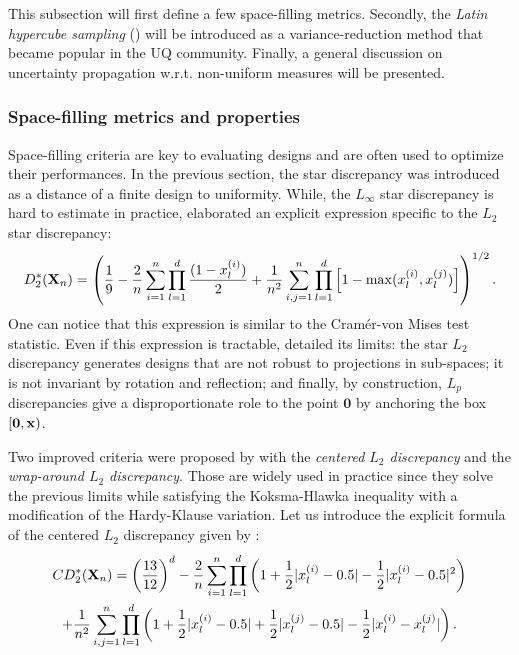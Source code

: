 This subsection will first define a few space-filling metrics. 
Secondly, the \textit{Latin hypercube sampling} () will be introduced as a variance-reduction method that became popular in the UQ community. 
Finally, a general discussion on uncertainty propagation w.r.t. non-uniform measures will be presented.

\subsubsection{Space-filling metrics and properties}
Space-filling criteria are key to evaluating designs and are often used to optimize their performances. 
In the previous section, the star discrepancy was introduced as a distance of a finite design to uniformity. 
While, the $L_\infty$ star discrepancy is hard to estimate in practice, \citet{warnock_1972} elaborated an explicit expression specific to the $L_2$ star discrepancy: 
\begin{equation}
    D^*_2({\bf X}_n) = \left(\frac19 - \frac2n \sum_{i=1}^{n} \prod_{l=1}^{d} \frac{(1-x_l^{(i)})}{2} + \frac{1}{n^2}\sum_{i,j=1}^{n} \prod_{l=1}^{d} \left[1 - \max(x_l^{(i)}, x_l^{(j)})\right]\right)^{1/2}.
\end{equation}
One can notice that this expression is similar to the Cram\'{e}r-von Mises test statistic. 
Even if this expression is tractable, \citet{fang_liu_2018} detailed its limits: 
the star $L_2$ discrepancy generates designs that are not robust to projections in sub-spaces; 
it is not invariant by rotation and reflection; 
and finally, by construction, $L_p$ discrepancies give a disproportionate role to the point $\mathbf{0}$ by anchoring the box $[\mathbf{0}, {\bf x})$.

Two improved criteria were proposed by \citet{hickernell_1998} with the \textit{centered $L_2$ discrepancy} and the \textit{wrap-around $L_2$ discrepancy}. 
Those are widely used in practice since they solve the previous limits while satisfying the Koksma-Hlawka inequality with a modification of the Hardy-Klause variation. 
Let us introduce the explicit formula of the centered $L_2$ discrepancy given by \citet{hickernell_1998}:
\begin{multline} CD^*_2({\bf X}_n)  = \left(\frac{13}{12}\right)^{d} - \frac{2}{n} \sum_{i=1}^{n} \prod_{l=1}^{d} \left( 1 + \frac{1}{2} |x_l^{(i)} - 0.5| - \frac{1}{2} |x_l^{(i)} - 0.5|^2 \right)\\
    + \frac{1}{n^2} \sum_{i,j=1}^{n} \prod_{l=1}^{d} \left( 1 + \frac{1}{2} |x_l^{(i)} - 0.5| + \frac{1}{2} |x_l^{(j)} - 0.5| - \frac{1}{2} |x_l^{(i)} - x_l^{(j)}| \right).
\end{multline}

